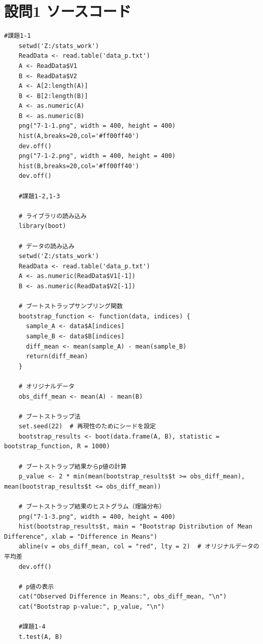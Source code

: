 \documentclass[fontsize = 10pt, paper= a4,twocolumn,column_gap=5zw]{jlreq}
\begin{document}
\section{設問1 ソースコード}
\begin{lstlisting}[basicstyle=\ttfamily\footnotesize, frame=single, caption=s2212022-1.c ,label=s2212022-1.c]
    #課題1-1
    setwd('Z:/stats_work')
    ReadData <- read.table('data_p.txt')
    A <- ReadData$V1
    B <- ReadData$V2
    A <- A[2:length(A)]
    B <- B[2:length(B)]
    A <- as.numeric(A)
    B <- as.numeric(B)
    png("7-1-1.png", width = 400, height = 400)
    hist(A,breaks=20,col='#ff00ff40')
    dev.off()
    png("7-1-2.png", width = 400, height = 400)
    hist(B,breaks=20,col='#ff00ff40')
    dev.off()
    
    #課題1-2,1-3
    
    # ライブラリの読み込み
    library(boot)
    
    # データの読み込み
    setwd('Z:/stats_work')
    ReadData <- read.table('data_p.txt')
    A <- as.numeric(ReadData$V1[-1])
    B <- as.numeric(ReadData$V2[-1])
    
    # ブートストラップサンプリング関数
    bootstrap_function <- function(data, indices) {
      sample_A <- data$A[indices]
      sample_B <- data$B[indices]
      diff_mean <- mean(sample_A) - mean(sample_B)
      return(diff_mean)
    }
    
    # オリジナルデータ
    obs_diff_mean <- mean(A) - mean(B)
    
    # ブートストラップ法
    set.seed(22)  # 再現性のためにシードを設定
    bootstrap_results <- boot(data.frame(A, B), statistic = bootstrap_function, R = 1000)
    
    # ブートストラップ結果からp値の計算
    p_value <- 2 * min(mean(bootstrap_results$t >= obs_diff_mean), mean(bootstrap_results$t <= obs_diff_mean))
    
    # ブートストラップ結果のヒストグラム（理論分布）
    png("7-1-3.png", width = 400, height = 400)
    hist(bootstrap_results$t, main = "Bootstrap Distribution of Mean Difference", xlab = "Difference in Means")
    abline(v = obs_diff_mean, col = "red", lty = 2)  # オリジナルデータの平均差
    dev.off()
    
    # p値の表示
    cat("Observed Difference in Means:", obs_diff_mean, "\n")
    cat("Bootstrap p-value:", p_value, "\n")
    
    #課題1-4
    t.test(A, B)
    \end{lstlisting}
\end{document}
